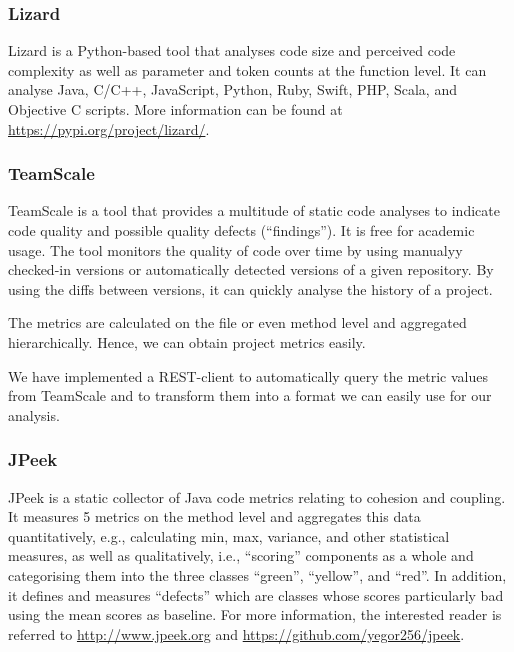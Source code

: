 \documentclass{scrartcl}
\begin{document}
\subsubsection{Lizard}
\label{sec:lizard}

Lizard is a Python-based tool that analyses code size and perceived code
complexity as well as parameter and token counts at the function level. It can
analyse Java, C/C++, JavaScript, Python, Ruby, Swift, PHP, Scala, and Objective
C scripts.  More information can be found at
\url{https://pypi.org/project/lizard/}.

\subsubsection{TeamScale}
\label{sec:teamscale}

TeamScale is a tool that provides a multitude of static code analyses to
indicate code quality and possible quality defects (\enquote{findings}). It is
free for academic usage. The tool monitors the quality of code over time by
using manualyy checked-in versions or automatically detected versions of a given
repository. By using the diffs between versions, it can quickly analyse the
history of a project.

The metrics are calculated on the file or even method level and aggregated
hierarchically. Hence, we can obtain project metrics easily.

We have implemented a REST-client to automatically query the metric values from
TeamScale and to transform them into a format we can easily use for our
analysis.

\subsubsection{JPeek}

JPeek is a static collector of Java code metrics relating to cohesion and
coupling. It measures 5 metrics on the method level and aggregates this data
quantitatively, e.g., calculating min, max, variance, and other statistical
measures,  as well as qualitatively, i.e., \enquote{scoring} components as a
whole and categorising them into the three classes \enquote{green},
\enquote{yellow}, and \enquote{red}. In addition, it defines and measures
\enquote{defects} which are classes whose scores particularly bad using the mean
scores as baseline.  For more information, the interested reader is referred to
\url{http://www.jpeek.org} and \url{https://github.com/yegor256/jpeek}.
\end{document}
